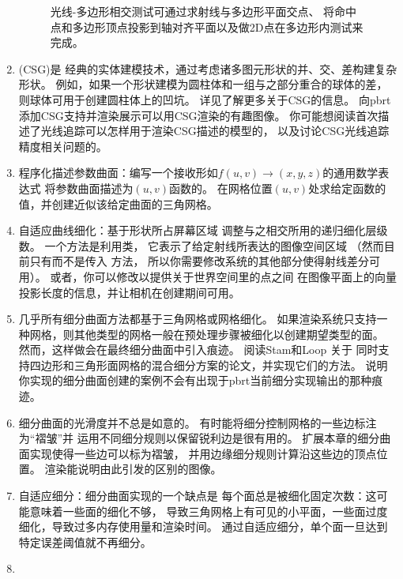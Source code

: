 \begin{enumerate}
\begin{figure}[htbp]
              \caption{光线-多边形相交测试可通过求射线与多边形平面交点、
                  将命中点和多边形顶点投影到轴对齐平面以及做2D点在多边形内测试来完成。}
              \label{fig:3.47}
          \end{figure}
    \item \circletwo {}(CSG)是
          经典的实体建模技术，通过考虑诸多图元形状的并、交、差构建复杂形状。
          例如，如果一个形状建模为圆柱体和一组与之部分重合的球体的差，
          则球体可用于创建圆柱体上的凹坑。
          详见\citet{10.5555/74803}了解更多关于CSG的信息。
          向pbrt添加CSG支持并渲染展示可以用CSG渲染的有趣图像。
          你可能想阅读首次描述了光线追踪可以怎样用于渲染CSG描述的模型的\citet{ROTH1982109}，
          以及讨论CSG光线追踪精度相关问题的\citet{10.5555/93267.93276}。
    \item \circletwo 程序化描述参数曲面：编写一个接收形如$f(u,v)\rightarrow(x,y,z)$的通用数学表达式
          将参数曲面描述为$(u,v)$函数的。
          在网格位置$(u,v)$处求给定函数的值，并创建近似该给定曲面的三角网格。
    \item \circletwo 自适应曲线细化：基于形状所占屏幕区域
          调整与之相交所用的递归细化层级数。
          一个方法是利用类，
          它表示了给定射线所表达的图像空间区域
          （然而目前只有而不是传入
          方法，
          所以你需要修改系统的其他部分使得射线差分可用）。
          或者，你可以修改以提供关于世界空间里的点之间
          在图像平面上的向量投影长度的信息，并让相机在创建期间可用。
    \item \circlethree 几乎所有细分曲面方法都基于三角网格或网格细化。
          如果渲染系统只支持一种网格，则其他类型的网格一般在预处理步骤被细化以创建期望类型的面。
          然而，这样做会在最终细分曲面中引入痕迹。
          阅读Stam和Loop \parencite*{10.1111/1467-8659.t01-2-00647}关于
          同时支持四边形和三角形面网格的混合细分方案的论文，并实现它们的方法。
          说明你实现的细分曲面创建的案例不会有出现于pbrt当前细分实现输出的那种痕迹。
    \item \circletwo 细分曲面的光滑度并不总是如意的。
          有时能将细分控制网格的一些边标注为“褶皱”并
          运用不同细分规则以保留锐利边是很有用的。
          扩展本章的细分曲面实现使得一些边可以标为褶皱，
          并用边缘细分规则计算沿这些边的顶点位置。
          渲染能说明由此引发的区别的图像。
    \item \circlethree 自适应细分：细分曲面实现的一个缺点是
          每个面总是被细化固定次数：这可能意味着一些面的细化不够，
          导致三角网格上有可见的小平面，一些面过度细化，导致过多内存使用量和渲染时间。
          通过自适应细分，单个面一旦达到特定误差阈值就不再细分。
    \item
\end{enumerate}